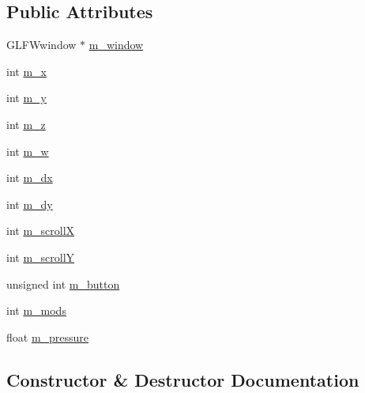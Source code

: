 \subsection*{Public Attributes}
\begin{DoxyCompactItemize}
\item 
G\+L\+F\+Wwindow $\ast$ \mbox{\hyperlink{structec_1_1_mouse_event_aaaf460aa884923e375b961e64a8d55aa}{m\+\_\+window}}
\item 
int \mbox{\hyperlink{structec_1_1_mouse_event_a671dcffa3a0310413d260bc6c5f3c7ec}{m\+\_\+x}}
\item 
int \mbox{\hyperlink{structec_1_1_mouse_event_a70f1a81a4a1099cb425a4461d23dfbba}{m\+\_\+y}}
\item 
int \mbox{\hyperlink{structec_1_1_mouse_event_a6ba4ec5d26b3dbe8be4d57b4197bada2}{m\+\_\+z}}
\item 
int \mbox{\hyperlink{structec_1_1_mouse_event_af7836a93b994d8807394fa24b25f31b8}{m\+\_\+w}}
\item 
int \mbox{\hyperlink{structec_1_1_mouse_event_aab5ddd319c18746f3d09ed09b5d2281e}{m\+\_\+dx}}
\item 
int \mbox{\hyperlink{structec_1_1_mouse_event_ad22c4d8c193a57c1ca849851ba5b4ebf}{m\+\_\+dy}}
\item 
int \mbox{\hyperlink{structec_1_1_mouse_event_a957534c425902b9de4a416459ef17aa5}{m\+\_\+scrollX}}
\item 
int \mbox{\hyperlink{structec_1_1_mouse_event_add0e314af571f90b9f514991ce19896f}{m\+\_\+scrollY}}
\item 
unsigned int \mbox{\hyperlink{structec_1_1_mouse_event_a094f93fb232556fd71f8351ffe03efb4}{m\+\_\+button}}
\item 
int \mbox{\hyperlink{structec_1_1_mouse_event_ae2df7e912c0ddbd14a67f7686ebdeba8}{m\+\_\+mods}}
\item 
float \mbox{\hyperlink{structec_1_1_mouse_event_a2a6711331cfcdbcc5b889c4805db48bf}{m\+\_\+pressure}}
\end{DoxyCompactItemize}


\subsection{Constructor \& Destructor Documentation}
\mbox{\label{structec_1_1_mouse_event_a4a2528518564c73d9b06284c9530b000}} 
